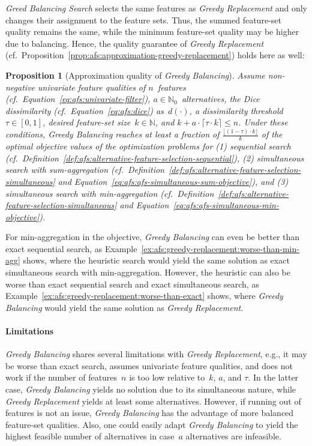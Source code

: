\documentclass{article}
\newtheorem{proposition}{Proposition}
\theoremstyle{definition}
\begin{document}
\emph{Greed Balancing Search} selects the same features as \emph{Greedy Replacement} and only changes their assignment to the feature sets.
Thus, the summed feature-set quality remains the same, while the minimum feature-set quality may be higher due to balancing.
Hence, the quality guarantee of \emph{Greedy Replacement} (cf.~Proposition~\ref{prop:afs:approximation-greedy-replacement}) holds here as well:
%
\begin{proposition}[Approximation quality of \emph{Greedy Balancing}]
	Assume non-negative univariate feature qualities of $n$~features (cf.~Equation~\ref{eq:afs:univariate-filter}), $a \in \mathbb{N}_0$~alternatives, the Dice dissimilarity (cf.~Equation~\ref{eq:afs:dice}) as~$d(\cdot)$, a dissimilarity threshold~$\tau \in [0,1]$, desired feature-set size~$k \in \mathbb{N}$, and $k + a \cdot \lceil \tau \cdot k \rceil \leq n$.
	Under these conditions, \emph{Greedy Balancing} reaches at least a fraction of $\frac{\lfloor (1 - \tau) \cdot k \rfloor}{k}$ of the optimal objective values of the optimization problems for (1) sequential search (cf.~Definition~\ref{def:afs:alternative-feature-selection-sequential}), (2) simultaneous search with sum-aggregation (cf.~Definition~\ref{def:afs:alternative-feature-selection-simultaneous} and Equation~\ref{eq:afs:afs-simultaneous-sum-objective}), and (3) simultaneous search with min-aggregation (cf.~Definition~\ref{def:afs:alternative-feature-selection-simultaneous} and Equation~\ref{eq:afs:afs-simultaneous-min-objective}).
	\label{prop:afs:approximation-greedy-balancing}
\end{proposition}
%
For min-aggregation in the objective, \emph{Greedy Balancing} can even be better than exact sequential search, as Example~\ref{ex:afs:greedy-replacement:worse-than-min-agg} shows, where the heuristic search would yield the same solution as exact simultaneous search with min-aggregation.
However, the heuristic can also be worse than exact sequential search and exact simultaneous search, as Example~\ref{ex:afs:greedy-replacement:worse-than-exact} shows, where \emph{Greedy Balancing} would yield the same solution as \emph{Greedy Replacement}.

\paragraph{Limitations}

\emph{Greedy Balancing} shares several limitations with \emph{Greedy Replacement}, e.g., it may be worse than exact search, assumes univariate feature qualities, and does not work if the number of features~$n$ is too low relative to~$k$, $a$, and $\tau$.
In the latter case, \emph{Greedy Balancing} yields no solution due to its simultaneous nature, while \emph{Greedy Replacement} yields at least some alternatives.
However, if running out of features is not an issue, \emph{Greedy Balancing} has the advantage of more balanced feature-set qualities.
Also, one could easily adapt \emph{Greedy Balancing} to yield the highest feasible number of alternatives in case~$a$ alternatives are infeasible.
\end{document}
